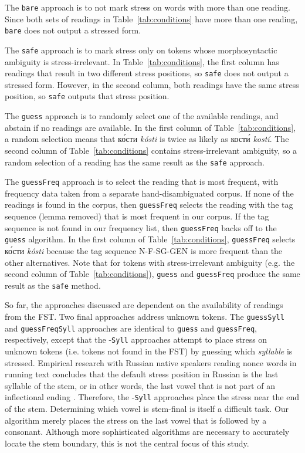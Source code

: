 \documentclass[11pt]{article}
\newcommand{\rus}[1]{\foreignlanguage{russian}{#1}}
\begin{document}
The {\small {\tt bare}} approach is to not mark stress on words with more than 
one reading. Since both sets of readings in Table~\ref{tab:conditions} have more
than one reading, {\small {\tt bare}} does not output a stressed form. 

The {\small {\tt safe}} approach is to mark stress only on
tokens whose morphosyntactic ambiguity is stress-irrelevant. In 
Table~\ref{tab:conditions}, the first column has readings that result in two
different stress positions, so {\small {\tt safe}} does not output a stressed
form. However, in the second column, both readings have the same stress position, 
so {\small {\tt safe}} outputs that stress position.

The {\small {\tt guess}} approach is to randomly select one of the available 
readings, and abstain if no readings are available. In the first column of
Table~\ref{tab:conditions}, a random selection means that \rus{к\'{о}сти} 
\emph{k\'{o}sti} is twice as likely as \rus{кост\'{и}} \emph{kost\'{i}}. The
second column of Table~\ref{tab:conditions} contains stress-irrelevant
ambiguity, so a random selection of a reading has the same result as the
{\small {\tt safe}} approach.
 
The {\small {\tt guessFreq}} 
approach is to select the reading that is most frequent, with frequency data
taken from a separate hand-disambiguated corpus. If none of the readings is 
found in the corpus, then {\small {\tt guessFreq}} selects the reading
with the tag sequence (lemma removed) that is most frequent in our corpus. If the 
tag sequence is not found
in our frequency list, then {\small {\tt guessFreq}} backs off to the 
{\small {\tt guess}} algorithm. In the first column of
Table~\ref{tab:conditions}, {\small {\tt guessFreq}} selects \rus{к\'{о}сти} 
\emph{k\'{o}sti} because the tag sequence N-F-SG-GEN is more frequent than the
other alternatives. Note 
that for tokens with stress-irrelevant ambiguity (e.g. the second column of
Table~\ref{tab:conditions}), {\small {\tt guess}} and 
{\small {\tt guessFreq}} produce the same result as the {\small {\tt safe}} 
method.

So far, the approaches discussed are
dependent on the availability of readings from the FST. Two final approaches 
address unknown tokens.
The {\small {\tt guessSyll}} and {\small {\tt guessFreqSyll}} approaches are 
identical to {\small {\tt guess}} and {\small {\tt guessFreq}}, respectively,
except that the -{\small {\tt Syll}} approaches attempt to place stress on
unknown tokens (i.e. tokens not found in the FST) by guessing which 
\emph{syllable} is stressed. Empirical research with
Russian native speakers reading nonce words in running text concludes that
the default stress position in Russian is the last syllable of the stem, or
in other words, the last vowel that is not part of an inflectional ending 
\cite{Crosswhite.ea-03}. Therefore, the -{\small {\tt Syll}} approaches 
place the stress near the end of the stem. Determining 
which vowel is stem-final
is itself a difficult task. Our algorithm merely places the stress on the last 
vowel that is followed by a consonant. Although more sophisticated algorithms
are necessary to accurately locate the stem boundary, this is not the central
focus of this study.
\end{document}
